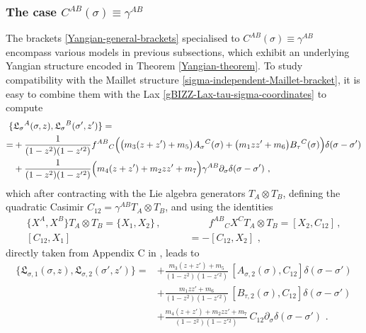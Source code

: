 \documentclass[12pt]{article}
\numberwithin{equation}{section}
\begin{document}
\subsubsection{The case $C^{AB}(\sigma)\equiv \gamma^{AB}$} 
The brackets \eqref{Yangian-general-brackets} specialised to $C^{AB}(\sigma)\equiv \gamma^{AB}$ encompass various models in previous subsections, which exhibit an underlying Yangian structure encoded in Theorem \ref{Yangian-theorem}. To study compatibility with the Maillet structure \eqref{sigma-independent-Maillet-bracket}, it is easy to combine them with the Lax \eqref{gBIZZ-Lax-tau-sigma-coordinates} to compute
\begin{align}
\{&\mathfrak{L}_{\sigma}{}^{A}(\sigma,z),\mathfrak{L}_{\sigma}{}^{B}(\sigma',z')\}=
\notag\\
=&+\frac{1}{(1-z^2)(1-z'{}^{2})}f^{AB}{}_{C}\Bigl( \bigl(m_{3}(z+z')+m_{5}\bigr)A_{\sigma}{}^{C}(\sigma)+\bigl(m_{1}zz'+m_{6}\bigr)B_{\tau}{}^{C}(\sigma)  \Bigr)\delta(\sigma-\sigma')
\notag \\
&+\frac{1}{(1-z^2)(1-z'{}^{2})}\Bigl(  m_{4}(z+z')+m_{2}zz'+m_{7} \Bigr)\gamma^{AB}\partial_{\sigma}\delta(\sigma-\sigma') \,\, ,
\end{align}
which after contracting with the Lie algebra generators $T_{A}\otimes T_{B}$, defining the quadratic Casimir $C_{12}=\gamma^{AB}T_{A}\otimes T_{B}$, and using the identities
\begin{equation}\label{contraction-identities-1}
\begin{aligned}
\{X^{A},X^{B}\}T_{A}\otimes T_{B}=\{X_{1},X_{2}\} \, ,
\qquad & \qquad 
f^{AB}{}_{C}X^{C}T_{A}\otimes T_{B}=[X_{2},C_{12}] \, ,
\\
[C_{12},X_{1}] &=-[C_{12},X_{2}] \,\, ,
\end{aligned}
\end{equation}
directly taken from Appendix C in \cite{Bielli:2024ach}, leads to
\begin{equation}\label{to-compare-1}
\begin{aligned}
\{\mathfrak{L}_{\sigma,1}(\sigma,z),\mathfrak{L}_{\sigma,2}(\sigma',z')\}=
&+\frac{m_{3}(z+z')+m_{5}}{(1-z^2)(1-z'{}^{2})} \, [ A_{\sigma,2}(\sigma),C_{12}]\delta(\sigma-\sigma')
\\
& +\frac{m_{1}zz'+m_{6}}{(1-z^2)(1-z'{}^{2})} \, [ B_{\tau,2}(\sigma),C_{12}]\delta(\sigma-\sigma')
\\
&+\frac{m_{4}(z+z')+m_{2}zz'+m_{7}}{(1-z^2)(1-z'{}^{2})}\,C_{12}\partial_{\sigma}\delta(\sigma-\sigma') \,\, .
\end{aligned}
\end{equation}
\end{document}
